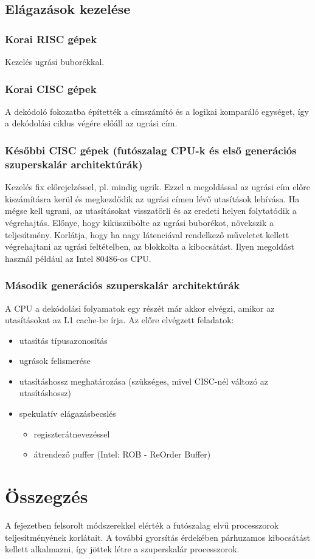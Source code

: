 \subsection{Elágazások kezelése}
\subsubsection{Korai RISC gépek}
Kezelés ugrási buborékkal.
\subsubsection{Korai CISC gépek}
A dekódoló fokozatba építették a címszámító és a logikai komparáló egységet, így a dekódolási ciklus végére előáll az ugrási cím.
\subsubsection{Későbbi CISC gépek (futószalag CPU-k és első generációs szuperskalár architektúrák)}
Kezelés fix előrejelzéssel, pl. mindig ugrik.
Ezzel a megoldással az ugrási cím előre kiszámításra kerül és megkezdődik az ugrási címen lévő utasítások lehívása.
Ha mégse kell ugrani, az utasításokat visszatörli és az eredeti helyen folytatódik a végrehajtás.
Előnye, hogy kiküszübölte az ugrási buborékot, növekszik a teljesítmény.
Korlátja, hogy ha nagy látenciával rendelkező műveletet kellett végrehajtani az ugrási feltételben, az blokkolta a kibocsátást.
Ilyen megoldást használ például az Intel 80486-os CPU.
\subsubsection{Második generációs szuperskalár architektúrák}
A CPU a dekódolási folyamatok egy részét már akkor elvégzi, amikor az utasításokat az L1 cache-be írja.
Az előre elvégzett feladatok:
\begin{itemize}
    \item utasítás típusazonosítás
    \item ugrások felismerése
    \item utasításhossz meghatározása (szükséges, mivel CISC-nél változó az utasításhossz)
    \item spekulatív elágazásbecslés
    \begin{itemize}
        \item regiszterátnevezéssel
        \item átrendező puffer (Intel: ROB - ReOrder Buffer)
    \end{itemize}
\end{itemize}

\section{Összegzés}
A fejezetben felsorolt módszerekkel elérték a futószalag elvű processzorok teljesítményének korlátait.
A további gyorsítás érdekében párhuzamos kibocsátást kellett alkalmazni, így jöttek létre a szuperskalár processzorok.